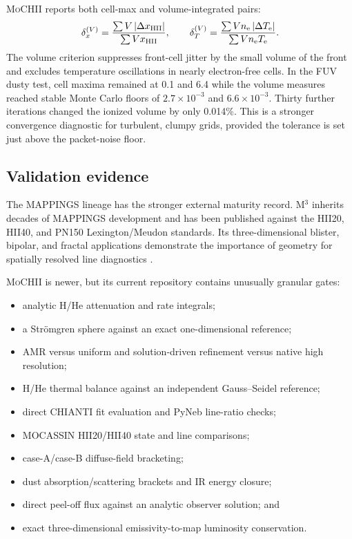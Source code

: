 \documentclass[english,a4paper]{my_memo}
\newcommand{\MoCHII}{\textsc{MoCHII}}
\newcommand{\Mthree}{M$^3$}
\newcommand{\Te}{T_{\rm e}}
\newcommand{\nelec}{n_{\rm e}}
\begin{document}
\MoCHII{} reports both cell-max and volume-integrated pairs:
\begin{equation}
 \delta_x^{(V)} =
 \frac{\sum V\,|\Delta x_{\rm HII}|}{\sum V x_{\rm HII}},
 \qquad
 \delta_T^{(V)} =
 \frac{\sum V\nelec\,|\Delta\Te|}{\sum V\nelec\Te}.
 \label{eq:conv}
\end{equation}
The volume criterion suppresses front-cell jitter by the small volume of
the front and excludes temperature oscillations in nearly electron-free
cells.  In the FUV dusty test, cell maxima remained at 0.1 and 6.4 while
the volume measures reached stable Monte Carlo floors of
$2.7\times10^{-3}$ and $6.6\times10^{-3}$.  Thirty further iterations
changed the ionized volume by only 0.014\%.  This is a stronger convergence
diagnostic for turbulent, clumpy grids, provided the tolerance is set just
above the packet-noise floor.

\subsection{Validation evidence}

The MAPPINGS lineage has the stronger external maturity record.  \Mthree{}
inherits decades of MAPPINGS development and has been published against the HII20, HII40,
and PN150 Lexington/Meudon standards.  Its three-dimensional blister,
bipolar, and fractal applications demonstrate the importance of geometry
for spatially resolved line diagnostics \cite{jin2022,jin2022fractal}.

\MoCHII{} is newer, but its current repository contains unusually granular
gates:

\begin{itemize}[leftmargin=2em]
\item analytic H/He attenuation and rate integrals;
\item a Str\"omgren sphere against an exact one-dimensional reference;
\item AMR versus uniform and solution-driven refinement versus native high
  resolution;
\item H/He thermal balance against an independent Gauss--Seidel reference;
\item direct CHIANTI fit evaluation and PyNeb line-ratio checks;
\item MOCASSIN HII20/HII40 state and line comparisons;
\item case-A/case-B diffuse-field bracketing;
\item dust absorption/scattering brackets and IR energy closure;
\item direct peel-off flux against an analytic observer solution; and
\item exact three-dimensional emissivity-to-map luminosity conservation.
\end{itemize}
\end{document}
